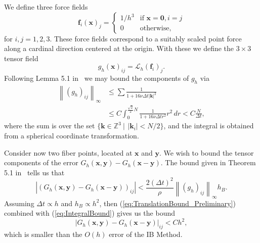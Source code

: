 \documentclass[preprint,12pt]{elsarticle}
\newcommand{\norm}[1]{\left\lVert#1\right\rVert}
\newcommand{\B}[1]{\mathbf{#1}}
\newcommand{\C}[1]{\mathcal{#1}}
\newcommand{\BB}[1]{\mathbb{#1}}
\begin{document}
We define three force fields
\begin{equation}
\B{f}_i(\B{x})_j = \begin{cases}
1/h^3& \textrm{if } \B{x} = \B{0}, i=j \\
0& \textrm{otherwise,}
\end{cases}
\end{equation}
for $i,j=1,2,3$. These force fields correspond to a suitably scaled point force along a cardinal direction centered at the origin. With these we define the $3\times 3$ tensor field
\begin{equation}
g_h(\B{x})_{ij} = \C{L}_h(\B{f}_i)_j.
\end{equation}
Following Lemma 5.1 in~\cite{IBM_Implicit2D} we may bound the components of $g_h$ via
\begin{equation}
\label{eq:IntegralBound}
\begin{split}
\norm{(g_h)_{ij}}_\infty &\leq
\sum %
\frac{1}{1 + 16\nu\Delta t |\B{k}|^2} \\
&\leq C \int_0^{\frac{\sqrt{2}}{2}N}\frac{1}{1 + 16\nu\Delta t r^2}r^2\,dr
< C\frac{N}{\Delta t},
\end{split}
\end{equation}
where the sum is over the set $\{\B{k}\in\BB{Z}^3 \: | \,\: |\B{k}_i| < N/2\}$, and the integral is obtained from a spherical coordinate transformation.

Consider now two fiber points, located at $\B{x}$ and $\B{y}$. We wish to bound the tensor components of the error $G_h(\B{x},\B{y})-G_h(\B{x}-\B{y})$. The bound given in Theorem 5.1 in~\cite{IBM_Implicit2D} tells us that 
\begin{equation}
|(G_h(\B{x},\B{y})-G_h(\B{x}-\B{y}))_{ij}|
< 
\frac{2(\Delta t)^2}{\rho} \norm{(g_h)_{ij}}_\infty h_B.
\label{eq:TranslationBound_Preliminary}
\end{equation}
Assuming $\Delta t \propto h$ and $h_B \propto h^2$, then (\ref{eq:TranslationBound_Preliminary}) combined with (\ref{eq:IntegralBound}) gives us the bound
\begin{equation}
|G_h(\B{x},\B{y})-G_h(\B{x}-\B{y})|_{ij}
< 
C h^2,
\end{equation}
which is smaller than the $O(h)$ error of the IB Method.




\end{document}
